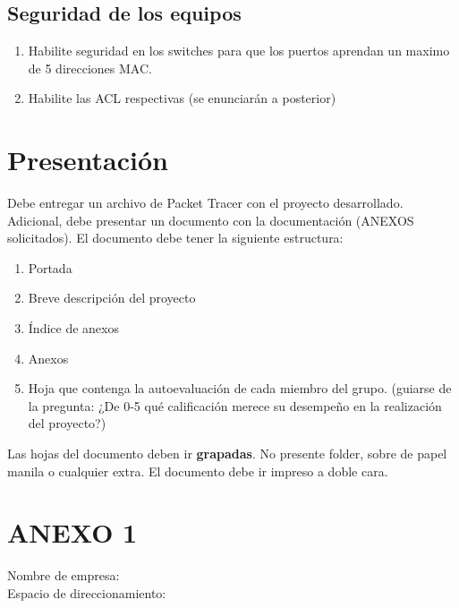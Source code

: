 \documentclass[12pt]{article}
\begin{document}
\subsection{Seguridad de los equipos}
\begin{enumerate}
\item Habilite seguridad en los switches para que los puertos aprendan un maximo de 5 direcciones MAC.
\item Habilite las ACL respectivas (se enunciarán a posterior)
\end{enumerate}

\section{Presentación}
Debe entregar un archivo de Packet Tracer con el proyecto desarrollado. Adicional, debe presentar un documento con la documentación (ANEXOS solicitados).
El documento debe tener la siguiente estructura:
\begin{enumerate}
\item Portada
\item Breve descripción del proyecto
\item Índice de anexos
\item Anexos
\item Hoja que contenga la autoevaluación de cada miembro del grupo. (guiarse de la pregunta: ¿De 0-5 qué calificación merece su desempeño en la realización del proyecto?)
\end{enumerate}

Las hojas del documento deben ir \textbf{grapadas}. No presente folder, sobre de papel manila o cualquier extra.
El documento debe ir impreso a doble cara.


\newpage
\section{ANEXO 1}

\noindent Nombre de empresa:\\
Espacio de direccionamiento:\\
\end{document}
